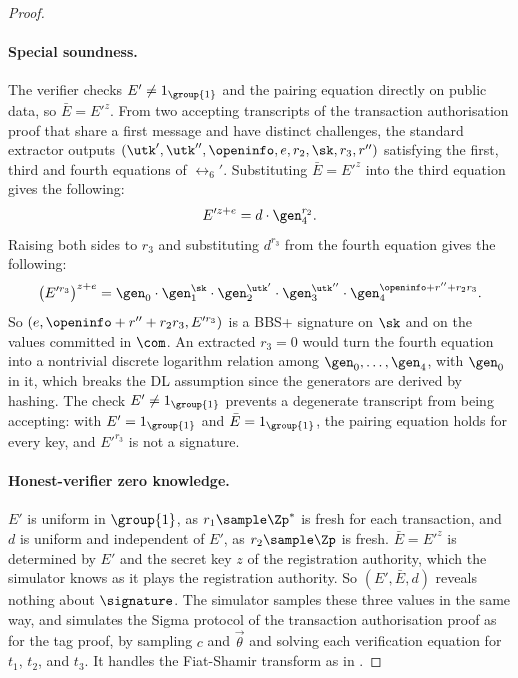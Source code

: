 \begin{proof}
  \paragraph{Special soundness.} The verifier checks $E' \neq 1_{\group{1}}$
and the pairing equation directly on public data, so $\bar{E} = E'^{z}$. From
two accepting transcripts of the transaction authorisation proof that share a
first message and have distinct challenges, the standard extractor outputs
$(\utk', \utk'', \openinfo, e, r_2, \sk, r_3, r'')$ satisfying the first, third
and fourth equations of $\rel_6'$. Substituting $\bar{E} = E'^{z}$ into the
third equation gives the following:
  \begin{equation*}
    E'^{z+e} = d\cdot\gen_4^{r_2}.
  \end{equation*}
  Raising both sides to $r_3$ and substituting $d^{r_3}$ from the fourth
equation gives the following:
  \begin{equation*}
    \big(E'^{r_3}\big)^{z+e} = \gen_0\cdot\gen_1^{\sk}\cdot\gen_2^{\utk'}\cdot
\gen_3^{\utk''}\cdot\gen_4^{\openinfo + r'' + r_2 r_3}.
  \end{equation*}
  So $(e, \openinfo + r'' + r_2 r_3, E'^{r_3})$ is a BBS+ signature on $\sk$
and on the values committed in $\com$. An extracted $r_3 = 0$ would turn the
fourth equation into a nontrivial discrete logarithm relation among $\gen_0,
\ldots, \gen_4$, with $\gen_0$ in it, which breaks the DL assumption since the
generators are derived by hashing. The check $E' \neq 1_{\group{1}}$
prevents a degenerate transcript from being accepting: with $E' = 1_{\group{1}}$
and $\bar{E} = 1_{\group{1}}$, the pairing equation holds for every key, and
$E'^{r_3}$ is not a signature.

  \paragraph{Honest-verifier zero knowledge.} $E'$ is uniform in $\group{1}$, as
$r_1 \sample \Zp^*$ is fresh for each transaction, and $d$ is uniform and
independent of $E'$, as $r_2 \sample \Zp$ is fresh. $\bar{E} = E'^{z}$ is
determined by $E'$ and the secret key $z$ of the registration authority, which
the simulator knows as it plays the registration authority. So $(E', \bar{E}, d)$ reveals nothing about
$\signature$. The simulator samples these three values in the same way, and
simulates the Sigma protocol of the transaction authorisation proof as for the
tag proof, by sampling $c$ and $\vec{\theta}$ and solving each verification
equation for $t_1$, $t_2$, and $t_3$. It handles the Fiat-Shamir transform as in
.

\end{proof}


